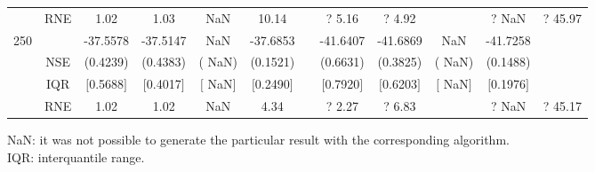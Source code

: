 \begin{table}[h]
\begin{tabular}{ccccccccccc}
  & RNE &   1.02 &   1.03 &    NaN &  10.14 &  &?   5.16 & ?   4.92 & & ?    NaN & ?  45.97   \\ [1ex] 
250 & & -37.5578 & -37.5147 &    NaN & -37.6853 & & -41.6407 & -41.6869 &    NaN & -41.7258  \\ 
  & NSE & (0.4239) & (0.4383) & (   NaN) & (0.1521) & & (0.6631) & (0.3825) & (   NaN) & (0.1488)   \\ 
 & IQR & $[$0.5688$]$ & $[$0.4017$]$ & $[$   NaN$]$ & $[$0.2490$]$ & & $[$0.7920$]$ & $[$0.6203$]$ & $[$   NaN$]$ & $[$0.1976$]$  \\  
  & RNE &   1.02 &   1.02 &    NaN &   4.34 &  &?   2.27 & ?   6.83 & & ?    NaN & ?  45.17   \\ [1ex] 
\hline 
\end{tabular} 
\raggedright 

\vspace{5pt}\footnotesize{NaN: it was not possible to generate the particular result with the corresponding algorithm.} \\ 
\vspace{5pt}\footnotesize{IQR: interquantile range.} 
\end{table} 
